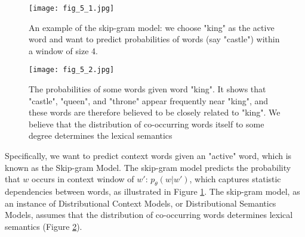 \documentclass[../main.tex]{subfiles}
\begin{document}
\begin{figure}[h] 
	\centering 
	\texttt{[image: fig\_5\_1.jpg]} 
	\caption{An example of the skip-gram model: we choose "king" as the active word and want to predict probabilities of words (say "castle") within a window of size 4.}\label{fig_5_1}
\end{figure}
\begin{figure}[h] 
	\centering 
	\texttt{[image: fig\_5\_2.jpg]} 
	\caption{The probabilities of some words given word "king". It shows that "castle", "queen", and "throne" appear frequently near "king", and these words are therefore believed to be closely related to "king". We believe that the distribution of co-occurring words itself to some degree determines the lexical semantics}\label{fig_5_2}
\end{figure}
\par Specifically, we want to predict context words given an "active" word, which is known as the Skip-gram Model. The skip-gram model predicts the probability that $w$ occurs in context window of $w'$: $p_{\theta}(w|w')$, which captures statistic dependencies between words, as illustrated in Figure \ref{fig_5_1}. The skip-gram model, as an instance of Distributional Context Models, or Distributional Semantics Models, assumes that the distribution of co-occurring words determines lexical semantics (Figure \ref{fig_5_2}).
\end{document}
